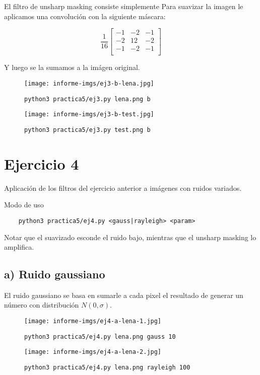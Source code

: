 \documentclass[11pt, spanish]{article}
\begin{document}
El filtro de unsharp masking consiste simplemente Para suavizar la imagen le aplicamos una convolución con la siguiente máscara:

\[
\frac{1}{16}
\begin{bmatrix}
-1 & -2 & -1 \\
-2 & 12 & -2 \\
-1 & -2 & -1 \\
\end{bmatrix}
\]

\noindent Y luego se la sumamos a la imágen original.

\begin{figure}[H]
\centering
  \texttt{[image: informe-imgs/ej3-b-lena.jpg]}
  \caption{\texttt{python3 practica5/ej3.py lena.png b}}
\end{figure}


\begin{figure}[H]
\centering
  \texttt{[image: informe-imgs/ej3-b-test.jpg]}
  \caption{\texttt{python3 practica5/ej3.py test.png b}}
\end{figure}


\newpage
\section{Ejercicio 4}

Aplicación de los filtros del ejercicio anterior a imágenes con ruidos variados.

Modo de uso
\begin{verbatim}
    python3 practica5/ej4.py <gauss|rayleigh> <param>
\end{verbatim}

Notar que el suavizado esconde el ruido bajo, mientras que el unsharp masking lo amplifica.

\subsection{a) Ruido gaussiano}

El ruido gaussiano se basa en sumarle a cada pixel el resultado de generar un número con distribución
$N(0, \sigma)$.

\begin{figure}[H]
\centering
  \texttt{[image: informe-imgs/ej4-a-lena-1.jpg]}
  \caption{\texttt{python3 practica5/ej4.py lena.png gauss 10}}
\end{figure}

\begin{figure}[H]
\centering
  \texttt{[image: informe-imgs/ej4-a-lena-2.jpg]}
  \caption{\texttt{python3 practica5/ej4.py lena.png rayleigh 100}}
\end{figure}
\end{document}
